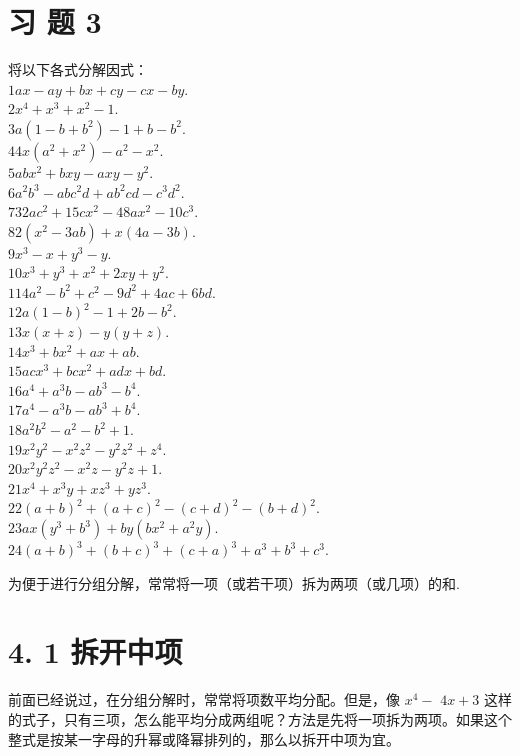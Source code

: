 \documentclass[10pt]{article}
\begin{document}
\section*{习 题 3}
将以下各式分解因式：\\
$1 a x-a y+b x+c y-c x-b y$.\\
$2 x^{4}+x^{3}+x^{2}-1$.\\
$3 a\left(1-b+b^{2}\right)-1+b-b^{2}$.\\
$44 x\left(a^{2}+x^{2}\right)-a^{2}-x^{2}$.\\
$5 a b x^{2}+b x y-a x y-y^{2}$.\\
$6 a^{2} b^{3}-a b c^{2} d+a b^{2} c d-c^{3} d^{2}$.\\
$732 a c^{2}+15 c x^{2}-48 a x^{2}-10 c^{3}$.\\
$82\left(x^{2}-3 a b\right)+x(4 a-3 b)$.\\
$9 x^{3}-x+y^{3}-y$.\\
$10 x^{3}+y^{3}+x^{2}+2 x y+y^{2}$.\\
$114 a^{2}-b^{2}+c^{2}-9 d^{2}+4 a c+6 b d$.\\
$12 a(1-b)^{2}-1+2 b-b^{2}$.\\
$13 x(x+z)-y(y+z)$.\\
$14 x^{3}+b x^{2}+a x+a b$.\\
$15 a c x^{3}+b c x^{2}+a d x+b d$.\\
$16 a^{4}+a^{3} b-a b^{3}-b^{4}$.\\
$17 a^{4}-a^{3} b-a b^{3}+b^{4}$.\\
$18 a^{2} b^{2}-a^{2}-b^{2}+1$.\\
$19 x^{2} y^{2}-x^{2} z^{2}-y^{2} z^{2}+z^{4}$.\\
$20 x^{2} y^{2} z^{2}-x^{2} z-y^{2} z+1$.\\
$21 x^{4}+x^{3} y+x z^{3}+y z^{3}$.\\
$22(a+b)^{2}+(a+c)^{2}-(c+d)^{2}-(b+d)^{2}$.\\
$23 a x\left(y^{3}+b^{3}\right)+b y\left(b x^{2}+a^{2} y\right)$.\\
$24(a+b)^{3}+(b+c)^{3}+(c+a)^{3}+a^{3}+b^{3}+c^{3}$.

为便于进行分组分解，常常将一项（或若干项）拆为两项（或几项）的和.

\section*{4. 1 拆开中项}
前面已经说过，在分组分解时，常常将项数平均分配。但是，像 $x^{4}-$ $4 x+3$ 这样的式子，只有三项，怎么能平均分成两组呢？方法是先将一项拆为两项。如果这个整式是按某一字母的升幂或降幂排列的，那么以拆开中项为宜。
\end{document}
